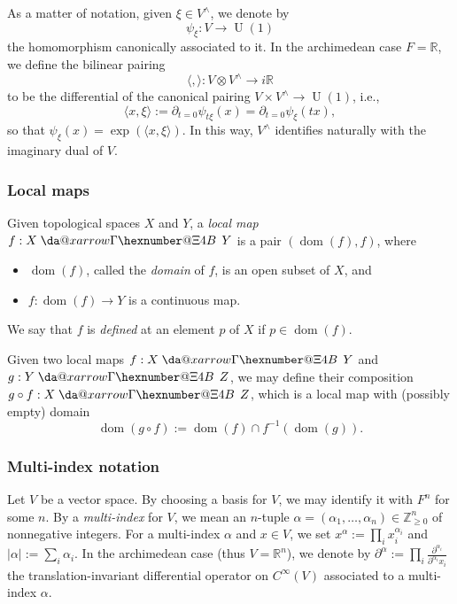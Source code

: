 \documentclass[reqno]{amsart}
\makeatletter
\newcommand*{\da@rightarrow}{\mathchar"0\hexnumber@\symAMSa 4B }
\newcommand*{\xdashrightarrow}[2][]{%
  \mathrel{%
    \mathpalette{\da@xarrow{#1}{#2}{}\da@rightarrow{\,}{}}{}%
  }%
}
\newcommand*{\da@xarrow}[7]{%
  \sbox0{$\ifx#7\scriptstyle\scriptscriptstyle\else\scriptstyle\fi#5#1#6\m@th$}%
  \sbox2{$\ifx#7\scriptstyle\scriptscriptstyle\else\scriptstyle\fi#5#2#6\m@th$}%
  \sbox4{$#7\dabar@\m@th$}%
  \dimen@=\wd0 %
  \ifdim\wd2 >\dimen@
    \dimen@=\wd2 %
  \fi
  \count@=2 %
  \def\da@bars{\dabar@\dabar@}%
  \@whiledim\count@\wd4<\dimen@\do{%
    \advance\count@\@ne
    \expandafter\def\expandafter\da@bars\expandafter{%
      \da@bars
      \dabar@ 
    }%
  }%
  \mathrel{#3}%
  \mathrel{%
    \mathop{\da@bars}\limits
    \ifx\\#1\\%
    \else
      _{\copy0}%
    \fi
    \ifx\\#2\\%
    \else
      ^{\copy2}%
    \fi
  }%
  \mathrel{#4}%
}
\DeclareMathOperator{\dom}{dom}
\DeclareMathOperator{\U}{U}
\theoremstyle{plain} \newtheorem{theorem} {Theorem}
\theoremstyle{definition} \newtheorem{definition} [theorem] {Definition}
\theoremstyle{itplain} %
\numberwithin{equation}{section}
\numberwithin{theorem}{section}
\renewcommand{\geq}{\geqslant}
\makeatother
\begin{document}
As a matter of notation, given $\xi \in V^\wedge$, we denote by 
\begin{equation*}
\psi_\xi : V \rightarrow \U(1)
\end{equation*}
the homomorphism canonically associated to it.  In the archimedean case $F = \mathbb{R}$, we define the bilinear pairing
\begin{equation*}
\langle ,  \rangle : V \otimes V^\wedge \rightarrow i \mathbb{R}
\end{equation*}
to be the differential of the canonical pairing $V \times V^\wedge \rightarrow \U(1)$, i.e.,
\begin{equation*}
  \langle x, \xi  \rangle := \partial_{t=0} \psi_{t \xi}(x) = \partial_{t=0} \psi_{\xi}(t x),
\end{equation*}
so that $\psi_{\xi}(x) = \exp(\langle x, \xi  \rangle)$.  In this way, $V^\wedge$ identifies naturally with the imaginary dual of $V$.


\subsubsection{Local maps}\label{sec:local-maps}
Given topological spaces $X$ and $Y$, a \emph{local map} $f : X \xdashrightarrow{} Y$ is a pair $(\dom(f), f)$, where
\begin{itemize}
\item $\dom(f)$, called the \emph{domain} of $f$, is an open subset of $X$, and
\item $f : \dom(f) \rightarrow Y$ is a continuous map.
\end{itemize}
We say that $f$ is \emph{defined} at an element $p$ of $X$ if $p \in \dom(f)$.

Given two local maps $f : X \xdashrightarrow{} Y$ and $g : Y \xdashrightarrow{} Z$, we may define their composition $g \circ f : X \xdashrightarrow{} Z$, which is a local map with (possibly empty) domain
\begin{equation*}
  \dom(g \circ f) := \dom(f) \cap f^{-1}(\dom(g)).
\end{equation*}

\subsubsection{Multi-index notation}\label{sec:multi-index-notation}
Let $V$ be a vector space.  By choosing a basis for $V$, we may identify it with $F^n$ for some $n$.  By a \emph{multi-index} for $V$, we mean an $n$-tuple $\alpha = (\alpha _1, \dotsc, \alpha _n ) \in \mathbb{Z} _{\geq 0} ^n$ of nonnegative integers.  For a multi-index $\alpha$ and $x \in V$, we set $x^\alpha := \prod_i x_i^{\alpha_i}$ and $|\alpha| := \sum_i \alpha_i$.  In the archimedean case (thus $V = \mathbb{R}^n$), we denote by $\partial^\alpha := \prod_i \frac{\partial^{\alpha_i}}{\partial ^{\alpha_i} x_i}$ the translation-invariant differential operator on $C^\infty(V)$ associated to a multi-index $\alpha$.
\end{document}
